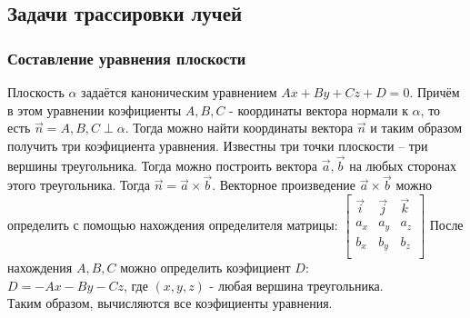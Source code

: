 \subsection{Задачи трассировки лучей} {
   \subsubsection{Составление уравнения плоскости} {
        Плоскость $\alpha$ задаётся каноническим уравнением
        $Ax + By + Cz + D = 0$.
        Причём в этом уравнении коэфициенты $A, B, C$ - координаты вектора нормали
        к $\alpha$, то есть $\vec{n} = {A, B, C} \perp \alpha$.
        Тогда можно найти координаты вектора $\vec{n}$ и таким образом
        получить три коэфициента уравнения.
        Известны три точки плоскости -- три вершины треугольника.
        Тогда можно построить вектора $\vec{a}, \vec{b}$ на любых
        сторонах этого треугольника.
        Тогда $\vec{n} = \vec{a} \times \vec{b}$.
        Векторное произведение $\vec{a} \times \vec{b}$ можно
        определить с помощью нахождения определителя матрицы:
        $
        \begin{bmatrix}
            \vec{i} & \vec{j} & \vec{k} \\
            a_x & a_y & a_z \\
            b_x & b_y & b_z \\
        \end{bmatrix}
        $
        После нахождения $A, B, C$ можно определить коэфициент $D$: \\
        $D = -Ax - By - Cz$, где $(x, y, z)$ - любая вершина треугольника. \\
        Таким образом, вычисляются все коэфициенты уравнения.
    }
}
